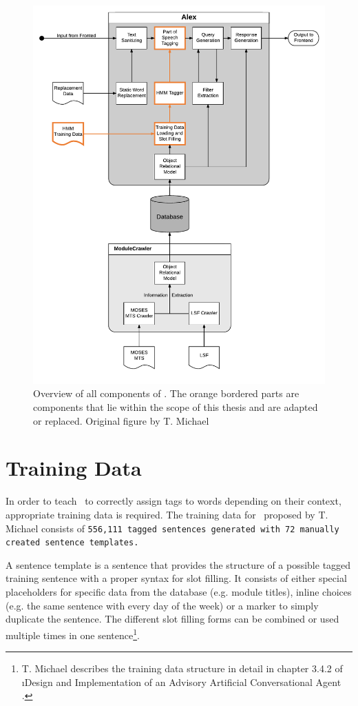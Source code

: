\begin{figure}[H]
	\includegraphics[width=\textwidth]{images/alex_components}
	\caption[Component Overview of \Alex]{Overview of all components of \Alex. The orange bordered parts are components that lie within the scope of this thesis and are adapted or replaced. Original figure by T. Michael \cite{michael2016}}
	\label{f.alex_components}
\end{figure}

\section{Training Data}\label{c.alex.data}
In order to teach \Alex\ to correctly assign tags to words depending on their context, appropriate training data is required. The training data for \Alex\ proposed by T. Michael consists of \tt{556,111} tagged sentences generated with \tt{72} manually created sentence templates.

A sentence template is a sentence that provides the structure of a possible tagged training sentence with a proper syntax for slot filling. It consists of either special placeholders for specific data from the database (e.g. module titles), inline choices (e.g. the same sentence with every day of the week) or a marker to simply duplicate the sentence. The different slot filling forms can be combined or used multiple times in one sentence\footnote{T. Michael describes the training data structure in detail in chapter 3.4.2 of \i{Design and Implementation of an Advisory Artificial Conversational Agent} \cite{michael2016}.}.

